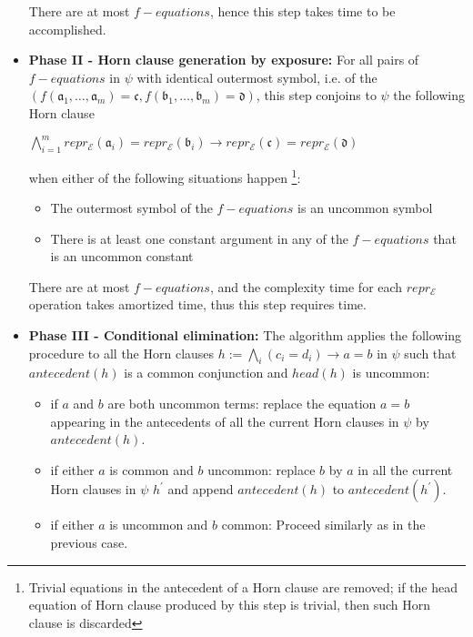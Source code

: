 \begin{itemize}
    There are at most  $f-equations$, hence this step
    takes  time to be accomplished.

  \item \textbf{Phase II - Horn clause generation by exposure:} 
    For all pairs of $f-equations$ in $\psi$ with identical 
    outermost symbol, i.e. of the
    $(f(\mathfrak{a}_1, \dots, \mathfrak{a}_m) = \mathfrak{c}, 
    f(\mathfrak{b}_1, \dots, \mathfrak{b}_m) = \mathfrak{d})$,
    this step conjoins to $\psi$ the following Horn clause 

    $\bigwedge_{i=1}^mrepr_{\mathcal{E}}(\mathfrak{a}_i)
    = repr_{\mathcal{E}}(\mathfrak{b}_i)
    \rightarrow
    repr_{\mathcal{E}}(\mathfrak{c}) 
    = repr_{\mathcal{E}}(\mathfrak{d})$

    when either of the following situations happen
    \footnote{Trivial equations in the antecedent
      of a Horn clause are removed; if the head equation 
      of Horn clause produced by this 
    step is trivial, then such Horn clause is discarded}:
    \begin{itemize}
      \item The outermost symbol of the $f-equations$ is an 
        uncommon symbol
      \item There is at least one constant argument in 
        any of the $f-equations$ 
        that is an uncommon constant
    \end{itemize}

    There are at most  $f-equations$, and the complexity
    time for each $repr_\mathcal{E}$ operation takes  
    amortized time, thus
    this step requires  time. 

  \item \textbf{Phase III - Conditional elimination:} 
    The algorithm applies the following procedure to
    all the Horn clauses 
    $h := \bigwedge_i (c_i = d_i) \rightarrow a = b$
    in $\psi$ such that 
    $antecedent(h)$ is a common conjunction and 
    $head(h)$ is uncommon:

    \begin{itemize}
      \item if $a$ and $b$ are both uncommon terms:
        replace the equation $a = b$ appearing in the antecedents
        of all the current Horn clauses in $\psi$ 
        by $antecedent(h)$.
      \item if either $a$ is common and $b$ uncommon: 
        replace $b$ by $a$
        in all the current Horn clauses in $\psi$
        $h^{'}$ and append $antecedent(h)$ to 
        $antecedent(h^{'})$.
      \item if either $a$ is uncommon and $b$ common: 
        Proceed similarly as in the
        previous case.
    \end{itemize}


\end{itemize}
